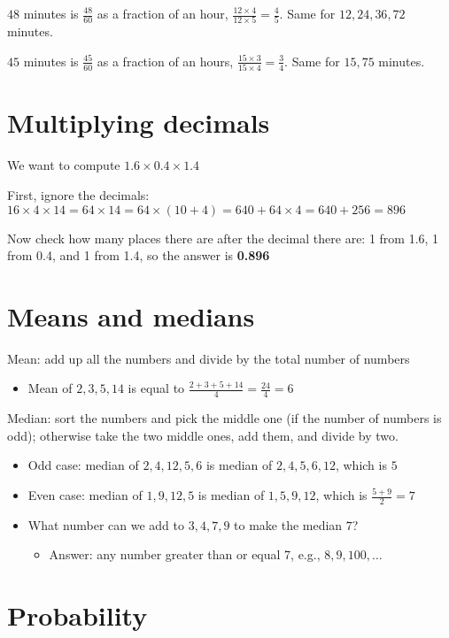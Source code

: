\documentclass[fullpage,twocolumn]{article}
\begin{document}
$48$ minutes is $\frac{48}{60}$ as a fraction of an hour, $\frac{12\times 4 }{12 \times 5} = \frac{4}{5}$. Same for $12, 24, 36, 72$ minutes.

$45$ minutes is $\frac{45}{60}$ as a fraction of an hours, $\frac{15 \times 3}{15 \times 4} = \frac{3}{4}$. Same for $15, 75$ minutes.



\section{Multiplying decimals}

We want to compute $1.6 \times 0.4 \times 1.4$

First, ignore the decimals:
$16 \times 4 \times 14 = 64 \times 14 = 64 \times (10 + 4) = 640 + 64 \times 4 = 640 + 256 = 896$

Now check how many places there are after the decimal there are: 1 from 1.6, 1 from 0.4, and 1 from 1.4,
so the answer is {\bf 0.896}

\section{Means and medians}

Mean: add up all the numbers and divide by the total number of numbers
\begin{itemize}
\item Mean of $2,3,5,14$ is equal to $\frac{2+3+5+14}{4} = \frac{24}{4} = 6$
\end{itemize} 

Median: sort the numbers and pick the middle one (if the number of numbers is odd); 
otherwise take the two middle ones, add them, and divide by two.
\begin{itemize}
\item Odd case: median of $2,4,12,5,6$ is median of $2,4,5,6,12$, which is $5$
\item Even case: median of $1,9,12,5$ is median of $1,5,9,12$, which is $\frac{5+9}{2}=7$
\item What number can we add to $3,4,7,9$ to make the median $7$? 
\begin{itemize}
\item Answer: any number greater than or equal 7, e.g., $8, 9, 100,\ldots$
\end{itemize} 
\end{itemize} 

\section{Probability}
\end{document}
